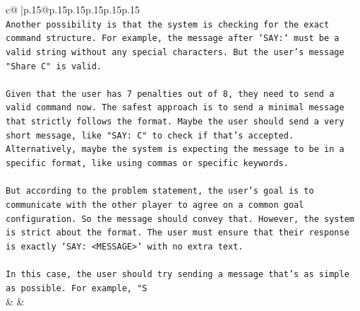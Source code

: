 \documentclass{article}
\begin{document}
{\begin{supertabular}{c@{$\;$}|p{.15\linewidth}@{}p{.15\linewidth}p{.15\linewidth}p{.15\linewidth}p{.15\linewidth}p{.15\linewidth}}
{{{\\ 
\texttt{Another possibility is that the system is checking for the exact command structure. For example, the message after `SAY:` must be a valid string without any special characters. But the user's message "Share C" is valid. } \\
\\ 
\texttt{Given that the user has 7 penalties out of 8, they need to send a valid command now. The safest approach is to send a minimal message that strictly follows the format. Maybe the user should send a very short message, like "SAY: C" to check if that's accepted. Alternatively, maybe the system is expecting the message to be in a specific format, like using commas or specific keywords.} \\
\\ 
\texttt{But according to the problem statement, the user's goal is to communicate with the other player to agree on a common goal configuration. So the message should convey that. However, the system is strict about the format. The user must ensure that their response is exactly `SAY: <MESSAGE>` with no extra text. } \\
\\ 
\texttt{In this case, the user should try sending a message that's as simple as possible. For example, "S} \\
            }
        }
    }
    & & \\ \\


\end{supertabular}}
\end{document}
